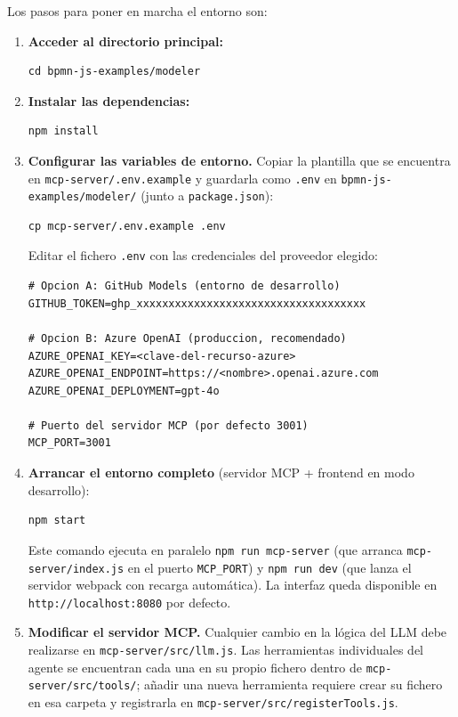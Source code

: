 Los pasos para poner en marcha el entorno son:

\begin{enumerate}

  \item \textbf{Acceder al directorio principal:}
  \begin{lstlisting}[style=promptbox]
cd bpmn-js-examples/modeler
  \end{lstlisting}

  \item \textbf{Instalar las dependencias:}
  \begin{lstlisting}[style=promptbox]
npm install
  \end{lstlisting}

  \item \textbf{Configurar las variables de entorno.}
  Copiar la plantilla que se encuentra en \texttt{mcp-server/.env.example} y guardarla como \texttt{.env} en \texttt{bpmn-js-examples/modeler/} (junto a \texttt{package.json}):
  \begin{lstlisting}[style=promptbox]
cp mcp-server/.env.example .env
  \end{lstlisting}
  Editar el fichero \texttt{.env} con las credenciales del proveedor elegido:
  \begin{lstlisting}[style=promptbox]
# Opcion A: GitHub Models (entorno de desarrollo)
GITHUB_TOKEN=ghp_xxxxxxxxxxxxxxxxxxxxxxxxxxxxxxxxxxxx

# Opcion B: Azure OpenAI (produccion, recomendado)
AZURE_OPENAI_KEY=<clave-del-recurso-azure>
AZURE_OPENAI_ENDPOINT=https://<nombre>.openai.azure.com
AZURE_OPENAI_DEPLOYMENT=gpt-4o

# Puerto del servidor MCP (por defecto 3001)
MCP_PORT=3001
  \end{lstlisting}

  \item \textbf{Arrancar el entorno completo} (servidor MCP + frontend en modo desarrollo):
  \begin{lstlisting}[style=promptbox]
npm start
  \end{lstlisting}
  Este comando ejecuta en paralelo \texttt{npm run mcp-server} (que arranca \texttt{mcp-server/index.js} en el puerto \texttt{MCP\_PORT}) y \texttt{npm run dev} (que lanza el servidor webpack con recarga automática). La interfaz queda disponible en \texttt{http://localhost:8080} por defecto.

  \item \textbf{Modificar el servidor MCP.}
  Cualquier cambio en la lógica del LLM debe realizarse en \texttt{mcp-server/src/llm.js}. Las herramientas individuales del agente se encuentran cada una en su propio fichero dentro de \texttt{mcp-server/src/tools/}; añadir una nueva herramienta requiere crear su fichero en esa carpeta y registrarla en \texttt{mcp-server/src/registerTools.js}.


\end{enumerate}
